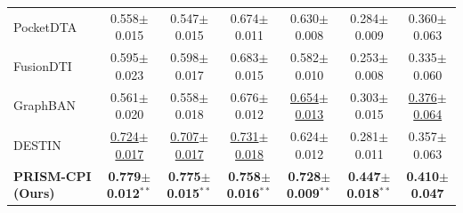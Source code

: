 \begin{table}[H]
{{\begin{tabular}{l ccc ccc}
PocketDTA & 0.558${\pm}$0.015 & 0.547${\pm}$0.015 & 0.674${\pm}$0.011 & 0.630${\pm}$0.008 & 0.284${\pm}$0.009 & 0.360${\pm}$0.063 \\
FusionDTI & 0.595${\pm}$0.023 & 0.598${\pm}$0.017 & 0.683${\pm}$0.015 & 0.582${\pm}$0.010 & 0.253${\pm}$0.008 & 0.335${\pm}$0.060 \\
GraphBAN & 0.561${\pm}$0.020 & 0.558${\pm}$0.018 & 0.676${\pm}$0.012 & \underline{0.654${\pm}$0.013} & 0.303${\pm}$0.015 & \underline{0.376${\pm}$0.064} \\
DESTIN & \underline{0.724${\pm}$0.017} & \underline{0.707${\pm}$0.017} & \underline{0.731${\pm}$0.018} & 0.624${\pm}$0.012 & 0.281${\pm}$0.011 & 0.357${\pm}$0.063 \\
\midrule
\textbf{PRISM-CPI (Ours)} & \textbf{0.779${\pm}$0.012}$^{**}$ & \textbf{0.775${\pm}$0.015}$^{**}$ & \textbf{0.758${\pm}$0.016}$^{**}$ & \textbf{0.728${\pm}$0.009}$^{**}$ & \textbf{0.447${\pm}$0.018}$^{**}$ & \textbf{0.410${\pm}$0.047} \\
\bottomrule
\end{tabular}%
}}
\end{table}
